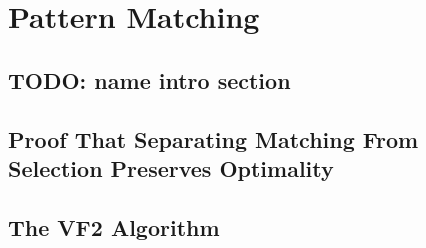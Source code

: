 %

\chapter{Pattern Matching}




\section{TODO: name intro section}




\section{Proof That Separating Matching From Selection Preserves Optimality}



\section{The VF2 Algorithm}

